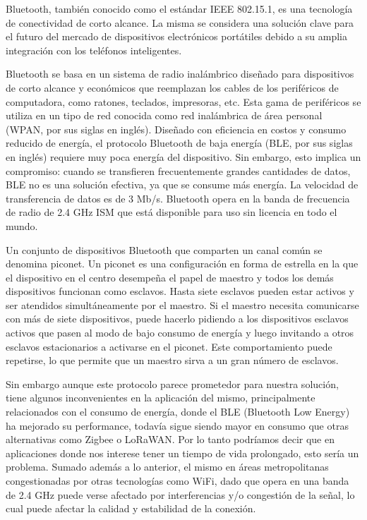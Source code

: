 Bluetooth, también conocido como el estándar IEEE 802.15.1, es una tecnología de conectividad de corto alcance. La misma se considera una solución clave para el futuro del mercado de dispositivos electrónicos portátiles debido a su amplia integración con los teléfonos inteligentes.

Bluetooth se basa en un sistema de radio inalámbrico diseñado para dispositivos de corto alcance y económicos que reemplazan los cables de los periféricos de computadora, como ratones, teclados, impresoras, etc. Esta gama de periféricos se utiliza en un tipo de red conocida como red inalámbrica de área personal (WPAN, por sus siglas en inglés). Diseñado con eficiencia en costos y consumo reducido de energía, el protocolo Bluetooth de baja energía (BLE, por sus siglas en inglés) requiere muy poca energía del dispositivo. Sin embargo, esto implica un compromiso: cuando se transfieren frecuentemente grandes cantidades de datos, BLE no es una solución efectiva, ya que se consume más energía. La velocidad de transferencia de datos es de 3 Mb/s. Bluetooth opera en la banda de frecuencia de radio de 2.4 GHz ISM que está disponible para uso sin licencia en todo el mundo.

Un conjunto de dispositivos Bluetooth que comparten un canal común se denomina piconet. Un piconet es una configuración en forma de estrella en la que el dispositivo en el centro desempeña el papel de maestro y todos los demás dispositivos funcionan como esclavos. Hasta siete esclavos pueden estar activos y ser atendidos simultáneamente por el maestro. Si el maestro necesita comunicarse con más de siete dispositivos, puede hacerlo pidiendo a los dispositivos esclavos activos que pasen al modo de bajo consumo de energía y luego invitando a otros esclavos estacionarios a activarse en el piconet. Este comportamiento puede repetirse, lo que permite que un maestro sirva a un gran número de esclavos.

Sin embargo aunque este protocolo parece prometedor para nuestra solución, tiene algunos inconvenientes en la aplicación del mismo, principalmente relacionados con el consumo de energía, donde el BLE (Bluetooth Low Energy) ha mejorado su performance, todavía sigue siendo mayor en consumo que otras alternativas como Zigbee o LoRaWAN. Por lo tanto podríamos decir que en aplicaciones donde nos interese tener un tiempo de vida prolongado, esto sería un problema. Sumado además a lo anterior, el mismo en áreas metropolitanas congestionadas por otras tecnologías como WiFi, dado que opera en una banda de 2.4 GHz puede verse afectado por interferencias y/o congestión de la señal, lo cual puede afectar la calidad y estabilidad de la conexión.

